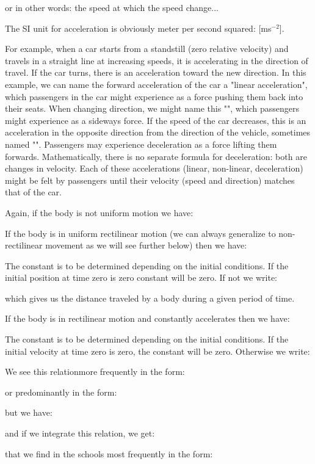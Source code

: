 	or in other words: the speed at which the speed change...
	
	The SI unit for acceleration is obviously meter per second squared: [ms$^{-2}$].
	
	For example, when a car starts from a standstill (zero relative velocity) and travels in a straight line at increasing speeds, it is accelerating in the direction of travel. If the car turns, there is an acceleration toward the new direction. In this example, we can name the forward acceleration of the car a "linear acceleration", which passengers in the car might experience as a force pushing them back into their seats. When changing direction, we might name this "", which passengers might experience as a sideways force. If the speed of the car decreases, this is an acceleration in the opposite direction from the direction of the vehicle, sometimes named "". Passengers may experience deceleration as a force lifting them forwards. Mathematically, there is no separate formula for deceleration: both are changes in velocity. Each of these accelerations (linear, non-linear, deceleration) might be felt by passengers until their velocity (speed and direction) matches that of the car.
	
	Again, if the body is not uniform motion we have:
	
	If the body is in uniform rectilinear motion (we can always generalize to non-rectilinear movement as we will see further below) then we have:
	
	The constant is to be determined depending on the initial conditions. If the initial position at time zero is zero constant will be zero. If not we write:
	
	which gives us the distance traveled by a body during a given period of time.
	
	If the body is in rectilinear motion and constantly accelerates then we have:
	
	The constant is to be determined depending on the initial conditions. If the initial velocity at time zero is zero, the constant will be zero. Otherwise we write:
	
	We see this relationmore frequently in the form:
	
	or predominantly in the form:
	
	but we have:
	
	and if we integrate this relation, we get:
	
	that we find in the schools most frequently in the form:
	
